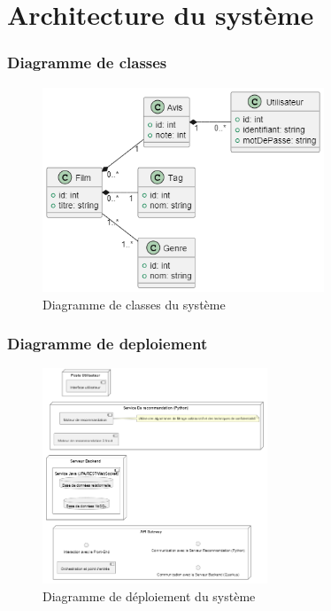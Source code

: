 \documentclass{beamer}
\begin{document}
\section{Architecture du système}
\begin{frame}
    \frametitle{Diagramme de classes}
    \vspace{0.5cm}
    \begin{figure}
        \centering
        \includegraphics[width=0.75\textwidth]{classe.png}
        \caption{\small Diagramme de classes du système}
    \end{figure}
\end{frame}

\begin{frame}
    \frametitle{Diagramme de deploiement}
    \vspace{0.5cm}
    \begin{figure}
        \centering
        \includegraphics[width=0.60\textwidth]{deploiement.png}
        \caption{\small Diagramme de déploiement du système}
    \end{figure}
\end{frame}
\end{document}
